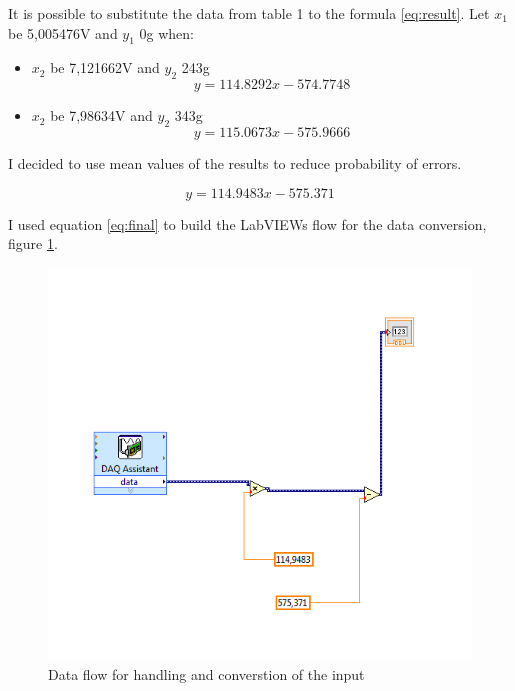 \documentclass[english]{article}
\begin{document}
It is possible to substitute the data from table 1 to the formula \ref{eq:result}. Let $x_1$ be 5,005476V and $y_1$ 0g when:

\begin{itemize}
\item $x_2$ be 7,121662V and $y_2$ 243g
\begin{equation} 
y = 114.8292 x - 574.7748
\end{equation}\label{eq:one}
\item $x_2$ be 7,98634V and $y_2$ 343g
\begin{equation} 
y = 115.0673 x - 575.9666
\end{equation}\label{eq:two}
\end{itemize}

I decided to use mean values of the results to reduce probability of errors.

\begin{equation} 
y = 114.9483 x - 575.371
\end{equation}\label{eq:final}

I used equation \ref{eq:final} to build the LabVIEWs flow for the data conversion, figure \ref{fig:lv}.

\begin{figure}[H]
\centerline{\includegraphics[scale=0.75]{labview/lv}}
\caption{Data flow for handling and converstion of the input\label{fig:lv}}
\end{figure}
\end{document}

